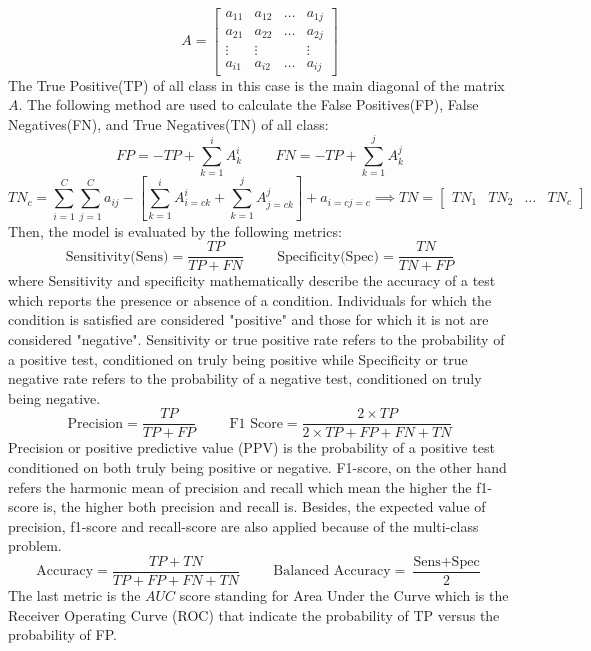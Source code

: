 \documentclass[sensors,article,submit,pdftex,moreauthors]{Definitions/mdpi}
\begin{document}
\[
A = \begin{bmatrix}
	a_{11} & a_{12} & \dots & a_{1j} \\
	a_{21} & a_{22} & \dots & a_{2j} \\
	\vdots & \vdots	&  & \vdots\\
	a_{i1} & a_{i2} & \dots & a_{ij} 
\end{bmatrix}
\]
The True Positive(TP) of all class in this case is the main diagonal of the matrix $A$. The following method are used to calculate the False Positives(FP), False Negatives(FN), and True Negatives(TN) of all class:
\[
FP = -TP + \sum_{k=1}^{i}A^i_k \hspace{1cm} FN = -TP + \sum_{k=1}^{j}A^j_k
\]
\[
TN_c = \sum_{i=1}^{C}\sum_{j=1}^{C}a_{ij} - \left[ \sum_{k=1}^{i}A^i_{i=c k} + \sum_{k=1}^{j}A^j_{j=c k} \right] + a_{i=c j=c} \implies TN = \begin{bmatrix}
	TN_1 & TN_2 & \dots & TN_c
\end{bmatrix}
\]
Then, the model is evaluated by the following metrics:
\[\text{Sensitivity(Sens)} = \frac{TP}{TP + FN} \hspace{1cm} \text{Specificity(Spec)} = \frac{TN}{TN + FP}\]
where Sensitivity and specificity mathematically describe the accuracy of a test which reports the presence or absence of a condition. Individuals for which the condition is satisfied are considered "positive" and those for which it is not are considered "negative". Sensitivity or true positive rate refers to the probability of a positive test, conditioned on truly being positive while Specificity  or true negative rate refers to the probability of a negative test, conditioned on truly being negative.
\[\text{Precision} = \frac{TP}{TP + FP} \hspace{1cm} \text{F1 Score} = \frac{2 \times TP}{2 \times TP + FP + FN + TN}\]
Precision or positive predictive value (PPV) is the probability of a positive test conditioned on both truly being positive or negative. F1-score, on the other hand refers the harmonic mean of precision and recall which mean the higher the f1-score is, the higher both precision and recall is. Besides, the expected value of precision, f1-score and recall-score are also applied because of the multi-class problem.
\[\text{Accuracy} = \frac{TP + TN}{TP + FP + FN + TN} \hspace{1cm} \text{Balanced Accuracy} = \frac{\text{Sens} + \text{Spec}}{2}\]
The last metric is the $AUC$ score standing for Area Under the Curve which is the Receiver Operating Curve (ROC) that indicate the probability of TP versus the probability of FP.  
\end{document}
